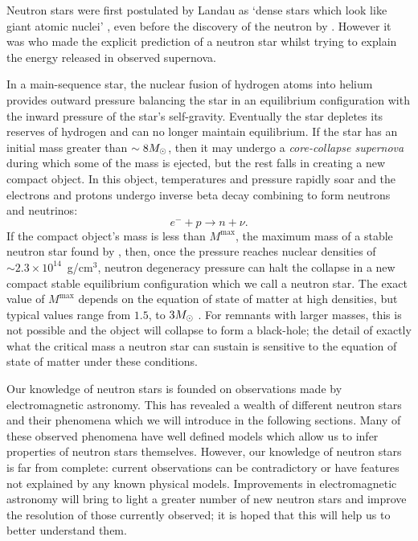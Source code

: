 \documentclass[../full_thesis/full_thesis.tex]{subfiles}
\begin{document}
 

Neutron stars were first postulated by Landau as `dense stars
which look like giant atomic nuclei' \citep{Yakovlev2013}, even before the
discovery of the neutron by \citet{Chadwick1932}. However it was
\citet{Baade1934} who made the explicit prediction of a neutron star whilst
trying to explain the energy released in observed supernova.

In a main-sequence star, the nuclear fusion of
hydrogen atoms into helium provides outward pressure balancing the star in an
equilibrium configuration with the inward pressure of the star's self-gravity.
Eventually the star depletes its reserves of hydrogen and can no longer
maintain equilibrium. If the star has an initial mass greater than $\sim 8
M_{\odot}$, then it may undergo a \emph{core-collapse supernova} during which some
of the mass is ejected, but the rest falls in creating a new compact object.
In this object, temperatures and pressure rapidly soar and the
electrons and protons undergo inverse beta decay combining to form neutrons and
neutrinos:
\begin{equation}
    e^{-} + p \rightarrow n + \nu.
\end{equation}
If the compact object's mass is less than $M^{\textrm{max}}$, the maximum
mass of a stable neutron star found by \citet{oppenheimer1939massive},
then, once the pressure
reaches nuclear densities of $\sim 2.3 \times10^{14}$~g/cm$^{3}$, neutron
degeneracy pressure can halt the collapse in a new compact stable equilibrium
configuration which we call a neutron star. The exact value of $M^{\textrm{max}}$
depends on the equation of state of matter at high densities, but typical values
range from $1.5$, to $3 M_{\odot}$ \citep{bombaci1996}.
For remnants with larger masses,
this is not possible and the object will collapse to form a black-hole; the
detail of exactly what the critical mass a neutron star can sustain is
sensitive to the equation of state of matter under these conditions.

Our knowledge of neutron stars is founded on observations made by
electromagnetic astronomy. This has revealed a wealth of different neutron
stars and their phenomena which we will introduce in the following sections.
Many of these observed phenomena have well defined models which allow us to
infer properties of neutron stars themselves.
However, our knowledge of neutron stars is far from complete: current
observations can be contradictory or have features not explained by any known
physical models. Improvements in electromagnetic astronomy will bring to light
a greater number of new neutron stars and improve the resolution of those
currently observed; it is hoped that this will help us to better understand them.
\end{document}

